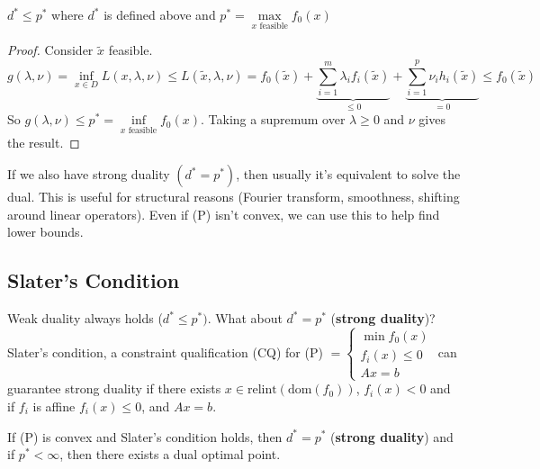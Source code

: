  \begin{thrm}
 $d^*  \le p^*$ where $d^*$ is defined above and $p^* = \max \limits_{x \text{ feasible}} f_0(x)$
 \end{thrm}
 
 \begin{proof}
 Consider $\tilde{x}$ feasible.
 \[
 g(\lambda,\nu) = \inf \limits_{x \in D} L(x,\lambda,\nu) \le L(\tilde{x},\lambda,\nu)
 = f_0(\tilde{x}) + \underbrace{\sum_{i=1}^m \lambda_i f_i(\tilde{x})}_{\le 0} + \underbrace{ \sum_{i=1}^p \nu_i h_i(\tilde{x})}_{=0}
 \le f_0(\tilde{x})
 \]
 So $g(\lambda,\nu) \le p^* = \inf \limits_{x \text{ feasible}} f_0 (x)$. Taking a supremum over $\lambda \ge 0$ and $\nu$ gives the result.
 \end{proof}
 
 \begin{rem}
 If we also have strong duality $(d^* = p^*)$, then usually it's equivalent to solve the dual. This is useful for structural reasons (Fourier transform, smoothness, shifting around linear operators). Even if (P) isn't convex, we can use this to help find lower bounds.
 \end{rem}

\subsection{Slater's Condition}
Weak duality always holds ($d^* \le p^*)$. What about $d^* = p^*$ ({\bf strong duality})? Slater's condition, a constraint qualification (CQ) for (P)
$=\begin{cases} \min f_0(x) \\ f_i(x) \le 0 \\ Ax =b \end{cases}$ can guarantee strong duality if there exists $x \in \text{relint}(\text{dom}(f_0))$, $f_i(x) <0$ and if $f_i$ is affine $f_i(x) \le 0$, and $Ax=b$.

\begin{thrm}
If (P) is convex and Slater's condition holds, then $d^* = p^*$ ({\bf strong duality}) and if $p^* < \infty$, then there exists a dual optimal point.
\end{thrm}

